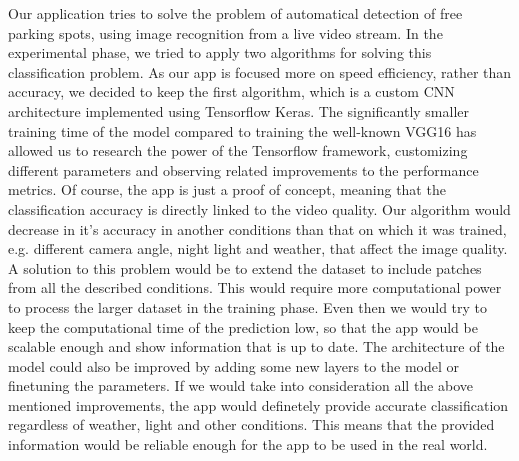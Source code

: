 \documentclass[runningheads,a4paper,11pt]{report}
\begin{document}
Our application tries to solve the problem of automatical detection of free parking spots, using image recognition from a live video stream. In the experimental phase, we tried to apply two algorithms for solving this classification problem. As our app is focused more on speed efficiency, rather than accuracy, we decided to keep the first algorithm, which is a custom CNN architecture implemented using Tensorflow Keras. The significantly smaller training time of the model compared to training the well-known VGG16 has allowed us to research the power of the Tensorflow framework, customizing different parameters and observing related improvements to the performance metrics.
Of course, the app is just a proof of concept, meaning that the classification accuracy is directly linked to the video quality. Our algorithm would decrease in it's accuracy in another conditions than that on which it was trained, e.g. different camera angle, night light and weather, that affect the image quality. A solution to this problem would be to extend the dataset to include patches from all the described conditions. This would require more computational power to process the larger dataset in the training phase. Even then we would try to keep the computational time of the prediction low, so that the app would be scalable enough and show information that is up to date. The architecture of the model could also be improved by adding some new layers to the model or finetuning the parameters.
If we would take into consideration all the above mentioned improvements, the app would definetely provide accurate classification regardless of weather, light and other conditions. This means that the provided information would be reliable enough for the app to be used in the real world.



\end{document}

